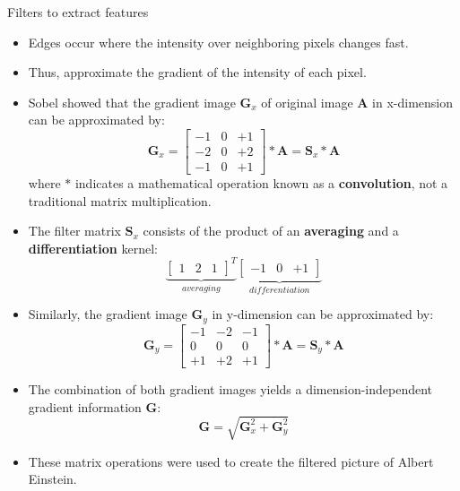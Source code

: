 \documentclass[11pt,compress,t,notes=noshow, xcolor=table]{beamer}
\begin{document}
\begin{vbframe}{Filters to extract features}
\begin{itemize}
\item Edges occur where the intensity over neighboring pixels changes fast.
\item Thus, approximate the gradient of the intensity of each pixel.
\item Sobel showed that the gradient image $\textbf{G}_x$ of original image $\textbf{A}$ in x-dimension  can be approximated by:
$$ \textbf{G}_x = 
\begin{bmatrix}
-1 & 0 & +1 \\
-2 & 0 & +2 \\
-1 & 0 & +1 
\end{bmatrix} * \textbf{A} = \textbf{S}_x * \textbf{A}
$$
where $*$ indicates a mathematical operation known as a \textbf{convolution}, not a traditional matrix multiplication.
\item The filter matrix $\textbf{S}_x$ consists of the product of an \textbf{averaging} and a \textbf{differentiation} kernel: 
$$
\underbrace{\begin{bmatrix}
1 & 2 & 1   
\end{bmatrix}^{T}}_{averaging}
\underbrace{\begin{bmatrix}
-1 & 0 & +1   
\end{bmatrix}}_{differentiation}
$$
\end{itemize}
\framebreak
    \begin{itemize}
        \item Similarly, the gradient image $\textbf{G}_y$ in y-dimension can be approximated by:
        $$
            \textbf{G}_y = 
            \begin{bmatrix}
                -1 & -2 & -1  \\
                0 & 0 & 0 \\
                +1 & +2 & +1
            \end{bmatrix} * \textbf{A} = \textbf{S}_y * \textbf{A}
        $$
        \item The combination of both gradient images yields a dimension-independent gradient information $\textbf{G}$:
        $$
            \textbf{G} = \sqrt{\textbf{G}_x^2 + \textbf{G}_y^2}
        $$
        \item These matrix operations were used to create the filtered picture of Albert Einstein.
    \end{itemize}
\end{vbframe}
\end{document}
